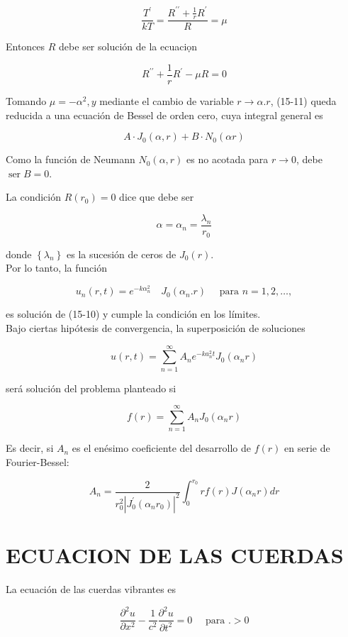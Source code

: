 \documentclass[10pt]{article}
\theoremstyle{plain}
\theoremstyle{definition}
\theoremstyle{remark}
\begin{document}
$$
\frac{T^{\prime}}{k T}=\frac{R^{\prime \prime}+\frac{1}{r} R^{\prime}}{R}=\mu
$$

Entonces $R$ debe ser solución de la ecuaciọn


\begin{equation*}
R^{\prime \prime}+\frac{1}{r} R^{\prime}-\mu R=0 \tag{$15\cdot11$}
\end{equation*}


Tomando $\mu=-\alpha^{2}, y$ mediante el cambio de variable $r \rightarrow \alpha . r$, (15-11) queda reducida a una ecuación de Bessel de orden cero, cuya integral general es

$$
A \cdot J_{0}(\alpha, r)+B \cdot N_{0}(\alpha r)
$$

Como la función de Neumann $N_{0}(\alpha, r)$ es no acotada para $r \rightarrow 0$, debe $\operatorname{ser} B=0$.

La condición $R\left(r_{0}\right)=0$ dice que debe ser

$$
\alpha=\alpha_{n}=\frac{\lambda_{n}}{r_{0}}
$$

donde $\left\{\lambda_{n}\right\}$ es la sucesión de ceros de $J_{0}(r)$.\\
Por lo tanto, la función

$$
u_{n}(r, t)=e^{-k \alpha_{n}^{2}} \quad J_{0}\left(\alpha_{n} . r\right) \quad \text { para } n=1,2, \ldots,
$$

es solución de (15-10) y cumple la condición en los límites.\\
Bajo ciertas hipótesis de convergencia, la superposición de soluciones

$$
u(r, t)=\sum_{n=1}^{\infty} A_{n} e^{-k a_{n}^{2} t} J_{0}\left(\alpha_{n} r\right)
$$

será solución del problema planteado si

$$
f(r)=\sum_{n=1}^{\infty} A_{n} J_{0}\left(\alpha_{n} r\right)
$$

Es decir, si $A_{n}$ es el enésimo coeficiente del desarrollo de $f(r)$ en serie de Fourier-Bessel:

$$
A_{n}=\frac{2}{r_{0}^{2}\left|J_{0}^{\prime}\left(\alpha_{n} r_{0}\right)\right|^{2}} \int_{0}^{r_{0}} r f(r) J\left(\alpha_{n} r\right) d r
$$

\section*{ECUACION DE LAS CUERDAS}
La ecuación de las cuerdas vibrantes es


\begin{equation*}
\frac{\partial^{2} u}{\partial x^{2}}-\frac{1}{c^{2}} \frac{\partial^{2} u}{\partial t^{2}}=0 \quad \text { para } .>0 \tag{$15\cdot12$}
\end{equation*}
\end{document}
